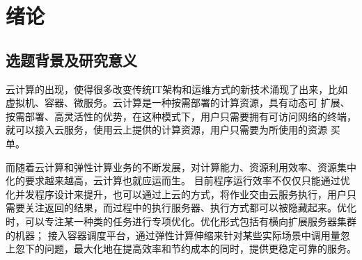 
\chapter{绪论}

%



%



%
%




%
%
%

\section{选题背景及研究意义}
云计算的出现，使得很多改变传统IT架构和运维方式的新技术涌现了出来，比如虚拟机、容器、微服务。云计算是一种按需部署的计算资源，具有动态可
扩展、按需部署、高灵活性的优势，在这种模式下，用户只需要拥有可访问网络的终端，就可以接入云服务，使用云上提供的计算资源，用户只需要为所使用的资源
买单。

而随着云计算和弹性计算业务的不断发展，对计算能力、资源利用效率、资源集中化的要求越来越高，云计算也就应运而生。
目前程序运行效率不仅仅只能通过优化并发程序设计来提升，也可以通过上云的方式，将作业交由云服务执行，用户只
需要关注返回的结果，而过程中的执行服务器、执行方式都可以被隐藏起来。优化时，可以专注某一种类的任务进行专项优化。优化形式包括有横向扩展服务器集群的机器；
接入容器调度平台，通过弹性计算伸缩来针对某些实际场景中调用量忽上忽下的问题，最大化地在提高效率和节约成本的同时，提供更稳定可靠的服务\cite{wfwbpyy}。

